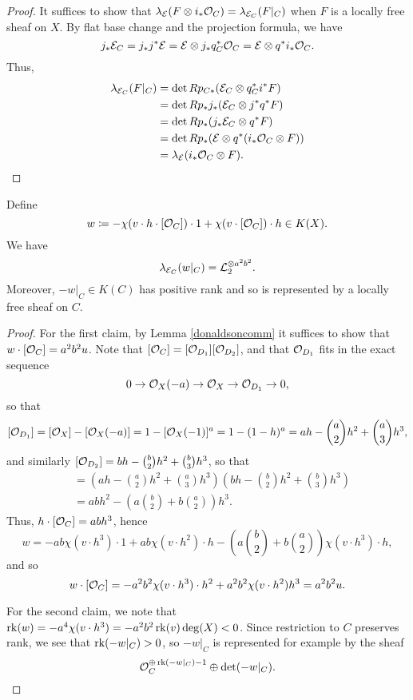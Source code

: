 \begin{proof}
    It suffices to show that $\lambda_{\mathcal{E}}(F \otimes i_*\mathcal{O}_C) = \lambda_{\mathcal{E}_C}(F|_C)$ when $F$ is a locally free sheaf on $X$. By flat base change and the projection formula, we have
    \[ j_*\mathcal{E}_C = j_* j^* \mathcal{E} = \mathcal{E} \otimes j_* q_C^*\mathcal{O}_C = \mathcal{E} \otimes q^* i_* \mathcal{O}_C. \]
    Thus,
    \begin{align*}
        \lambda_{\mathcal{E}_C}(F|_C) & = \det R p_{C*}(\mathcal{E}_C \otimes q_C^* i^* F) \\
        & = \det R p_* j_*(\mathcal{E}_C \otimes j^* q^* F) \\
        & = \det R p_* (j_*\mathcal{E}_C \otimes q^* F) \\
        & = \det R p_* (\mathcal{E} \otimes q^* (i_* \mathcal{O}_C \otimes F)) \\
        & = \lambda_{\mathcal{E}}(i_*\mathcal{O}_C \otimes F).
    \end{align*}
\end{proof}

\begin{propdef}\label{linebundleidentification}
Define
\[ w \coloneqq -\chi(v \cdot h \cdot [\mathcal{O}_C]) \cdot 1 + \chi(v \cdot [\mathcal{O}_C]) \cdot h \in K(X). \]
We have
\[ \lambda_{\mathcal{E}_C}(w|_C) = \mathcal{L}_2^{\otimes a^2 b^2}. \]
Moreover, $-w|_C \in K(C)$ has positive rank and so is represented by a locally free sheaf on $C$.
\end{propdef}
\begin{proof}
For the first claim, by Lemma \ref{donaldsoncomm} it suffices to show that $w\cdot [\mathcal{O}_C] = a^2 b^2 u$. Note that $[\mathcal{O}_C] = [\mathcal{O}_{D_1}][\mathcal{O}_{D_2}]$, and that $\mathcal{O}_{D_1}$ fits in the exact sequence
\[ 0 \to \mathcal{O}_X(-a) \to \mathcal{O}_X \to \mathcal{O}_{D_1} \to 0, \]
so that 
\[ [\mathcal{O}_{D_1}] = [\mathcal{O}_X] - [\mathcal{O}_X(-a)] = 1 - [\mathcal{O}_X(-1)]^a = 1 - (1-h)^a = a h - \binom{a}{2} h^2 + \binom{a}{3} h^3, \]
and similarly $[\mathcal{O}_{D_2}] = b h - \binom{b}{2} h^2 + \binom{b}{3} h^3$, so that
\begin{align*}
    [\Oh_C] & = (a h - \binom{a}{2} h^2 + \binom{a}{3} h^3)(b h - \binom{b}{2} h^2 + \binom{b}{3} h^3) \\
    & = a b h^2 - \left(a \binom{b}{2} + b \binom{a}{2} \right)h^3.
\end{align*} 
Thus, $h\cdot[\mathcal{O}_C] = a b h^3$, hence
\[ w = -a b \chi(v\cdot h^3) \cdot 1 + a b \chi(v \cdot h^2) \cdot h - \left(a \binom{b}{2} + b \binom{a}{2} \right)\chi(v\cdot h^3) \cdot h, \]
and so
\[ w \cdot [\mathcal{O}_C] = -a^2 b^2 \chi(v \cdot h^3) \cdot h^2 + a^2 b^2 \chi(v \cdot h^2) h^3 = a^2 b^2 u. \]

For the second claim, we note that $\operatorname{\mathrm{rk}}(w) = -a^4 \chi(v \cdot h^3) = - a^2 b^2 \operatorname{\mathrm{rk}}(v) \deg(X) < 0$. Since restriction to $C$ preserves rank, we see that $\operatorname{\mathrm{rk}}(-w|_C) > 0$, so $-w|_C$ is represented for example by the sheaf
\[ \mathcal{O}_C^{\oplus \operatorname{\mathrm{rk}}(-w|_C) - 1} \oplus \det(-w|_C). \]


\end{proof}

